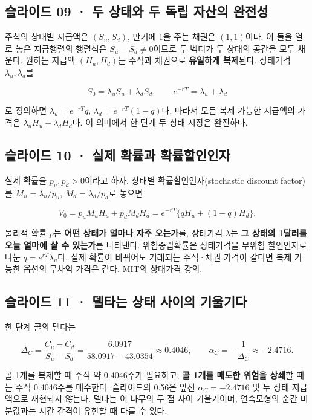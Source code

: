 \documentclass[11pt,a4paper]{article}
\begin{document}
\subsection{슬라이드 09 · 두 상태와 두 독립 자산의 완전성}
주식의 상태별 지급액은 $(S_u,S_d)$, 만기에 1을 주는 채권은 $(1,1)$이다. 이 둘을 열로 놓은 지급행렬의 행렬식은 $S_u-S_d\ne0$이므로 두 벡터가 두 상태의 공간을 모두 채운다. 원하는 지급액 $(H_u,H_d)$는 주식과 채권으로 \textbf{유일하게 복제}된다. 상태가격 $\lambda_u,\lambda_d$를\par

\[
S_0=\lambda_uS_u+\lambda_dS_d,\qquad
e^{-rT}=\lambda_u+\lambda_d
\]

로 정의하면 $\lambda_u=e^{-rT}q$, $\lambda_d=e^{-rT}(1-q)$다. 따라서 모든 복제 가능한 지급액의 가격은 $\lambda_uH_u+\lambda_dH_d$다. 이 의미에서 한 단계 두 상태 시장은 완전하다.\par

\subsection{슬라이드 10 · 실제 확률과 확률할인인자}
실제 확률을 $p_u,p_d>0$이라고 하자. 상태별 확률할인인자(stochastic discount factor)를 $M_u=\lambda_u/p_u$, $M_d=\lambda_d/p_d$로 놓으면\par

\[
V_0=p_uM_uH_u+p_dM_dH_d
=e^{-rT}\{qH_u+(1-q)H_d\}.
\]

물리적 확률 $p$는 \textbf{어떤 상태가 얼마나 자주 오는가}를, 상태가격 $\lambda$는 \textbf{그 상태의 1달러를 오늘 얼마에 살 수 있는가}를 나타낸다. 위험중립확률은 상태가격을 무위험 할인인자로 나눈 $q=e^{rT}\lambda_u$다. 실제 확률이 바뀌어도 거래되는 주식·채권 가격이 같다면 복제 가능한 옵션의 무차익 가격은 같다. \href{https://ocw.mit.edu/courses/15-450-analytics-of-finance-fall-2010/resources/mit15_450f10_lec01/}{MIT의 상태가격 강의}.\par

\subsection{슬라이드 11 · 델타는 상태 사이의 기울기다}
한 단계 콜의 델타는\par

\[
\Delta_C=\frac{C_u-C_d}{S_u-S_d}
=\frac{6.0917}{58.0917-43.0354}\approx0.4046,
\qquad \alpha_C=-\frac1{\Delta_C}\approx-2.4716.
\]

콜 1개를 복제할 때 주식 약 0.4046주가 필요하고, \textbf{콜 1개를 매도한 위험을 상쇄}할 때는 주식 0.4046주를 매수한다. 슬라이드의 0.56은 앞선 $\alpha_C=-2.4716$ 및 두 상태 지급액으로 재현되지 않는다. 델타는 이 나무의 두 점 사이 기울기이며, 연속모형의 순간 미분값과는 시간 간격이 유한할 때 다를 수 있다.\par
\end{document}
